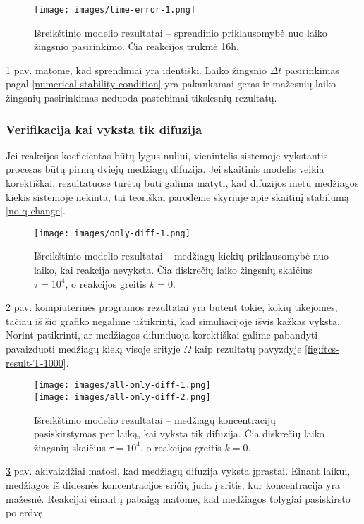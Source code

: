 \begin{figure}[h!]
  \centering
  \texttt{[image: images/time-error-1.png]}
  \caption{Išreikštinio modelio rezultatai -- sprendinio priklausomybė nuo laiko žingsnio pasirinkimo. Čia reakcijos trukmė 16h.}
\label{time-error}

\end{figure}

\ref{time-error} pav. matome, kad sprendiniai yra identiški. Laiko žingsnio  $\Delta t$ pasirinkimas pagal \eqref{numerical-stability-condition} yra pakankamai geras ir mažesnių laiko žingsnių pasirinkimas neduoda pastebimai tikslesnių rezultatų.

\newpage
\subsubsection*{Verifikacija kai vyksta tik difuzija}

Jei reakcijos koeficientas būtų lygus nuliui, vienintelis sistemoje vykstantis procesas būtų pirmų dviejų medžiagų difuzija. Jei skaitinis modelis veikia korektiškai, rezultatuose turėtų būti galima matyti, kad difuzijos metu medžiagos kiekis sistemoje nekinta, tai teoriškai parodėme skyriuje apie skaitinį stabilumą \eqref{no-q-change}.

\begin{figure}[h!]
    \centering
    \texttt{[image: images/only-diff-1.png]}
    \caption{Išreikštinio modelio rezultatai -- medžiagų kiekių priklausomybė nuo laiko, kai reakcija nevyksta. Čia diskrečių laiko žingsnių skaičius $\tau=10^4$, o reakcijos greitis $k = 0$. }
    \label{no-reaction}
\end{figure}

\ref{no-reaction} pav. kompiuterinės programos rezultatai yra būtent tokie, kokių tikėjomės, tačiau iš šio grafiko negalime užtikrinti, kad simuliacijoje išvis kažkas vyksta. Norint patikrinti, ar medžiagos difunduoja korektiškai galime pabandyti pavaizduoti medžiagų kiekį visoje srityje $\Omega$ kaip rezultatų pavyzdyje \eqref{fig:ftcs-result-T-1000}.

\begin{figure}[h!]
\centering
\texttt{[image: images/all-only-diff-1.png]} \\
\texttt{[image: images/all-only-diff-2.png]}

\caption{Išreikštinio modelio rezultatai -- medžiagų koncentracijų pasiskirstymas per laiką, kai vyksta tik difuzija. Čia diskrečių laiko žingsnių skaičius $\tau=10^4$, o reakcijos greitis $k = 0$. }

\label{only-diffusion}
\end{figure}

\ref{only-diffusion} pav. akivaizdžiai matosi, kad medžiagų difuzija vyksta įprastai. Einant laikui, medžiagos iš didesnės koncentracijos sričių juda į sritis, kur koncentracija yra mažesnė. Reakcijai einant į pabaigą matome, kad medžiagos tolygiai pasiskirsto po erdvę.


